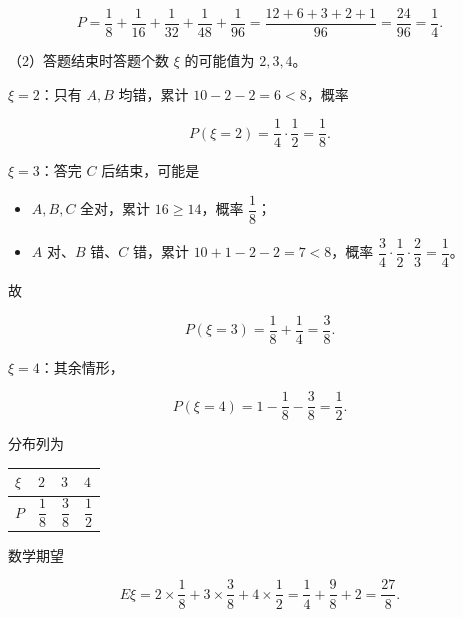 \begin{answer}
\nopagebreak[4]
\[P=\frac18+\frac1{16}+\frac1{32}+\frac1{48}+\frac1{96}
=\frac{12+6+3+2+1}{96}=\frac{24}{96}=\frac14.\]

（2）答题结束时答题个数 $\xi$ 的可能值为 $2,3,4$。

$\xi=2$：只有 $A,B$ 均错，累计 $10-2-2=6<8$，概率

\nopagebreak[4]
\[P(\xi=2)=\frac14\cdot\frac12=\frac18.\]

$\xi=3$：答完 $C$ 后结束，可能是

\begin{itemize}
\item $A,B,C$ 全对，累计 $16\geqslant14$，概率 $\dfrac18$；
\item $A$ 对、$B$ 错、$C$ 错，累计 $10+1-2-2=7<8$，概率 $\dfrac34\cdot\dfrac12\cdot\dfrac23=\dfrac14$。
\end{itemize}

故

\nopagebreak[4]
\[P(\xi=3)=\frac18+\frac14=\frac38.\]

$\xi=4$：其余情形，

\nopagebreak[4]
\[P(\xi=4)=1-\frac18-\frac38=\frac12.\]

分布列为

\begin{center}
\begin{tabular}{llll}
\toprule
$\xi$ & $2$ & $3$ & $4$ \\
\midrule
$P$ & $\dfrac18$ & $\dfrac38$ & $\dfrac12$ \\
\bottomrule
\end{tabular}
\end{center}

数学期望

\nopagebreak[4]
\[E\xi=2\times\frac18+3\times\frac38+4\times\frac12
=\frac14+\frac98+2=\frac{27}{8}.\]


\end{answer}
